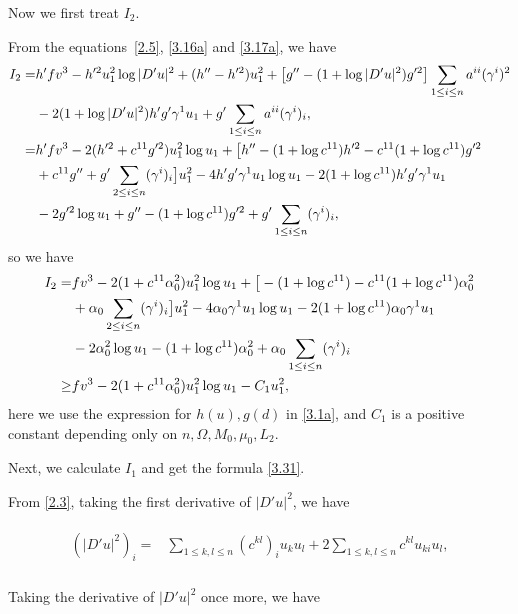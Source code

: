 \documentclass[11pt]{amsart}
\numberwithin{equation}{section}
\begin{document}
Now we first treat $I_2$.

From the equations~\eqref{2.5}, \eqref{3.16a}  and \eqref{3.17a}, we have
\begin{align}
I_2
=&h'f v^3-h'^2u_1^2\log|D'u|^2+(h''-h'^2)u_1^2+\big[g''-(1+\log|D'u|^2)g'^2\big]\sum_{1\leq i\leq n}a^{ii}(\gamma^i)^2\notag\\
&-2(1+\log|D'u|^2)h'g'\gamma^1u_1+g'\sum_{1\leq i\leq n}a^{ii}(\gamma^i)_i,\notag\\
=&h'f v^3-2(h'^2+c^{11}g'^2) u_1^2\log u_1+\big[h''-(1+\log c^{11})h'^2-c^{11}(1+\log c^{11})g'^2\notag\\
&+c^{11}g''+g'\sum_{2\leq i\leq n}(\gamma^i)_i\big] u_1^2-4h'g'\gamma^1 u_1\log u_1-2(1+\log c^{11})h'g'\gamma^1 u_1\notag\\
&-2g'^2 \log u_1+g''-(1+\log c^{11})g'^2
+g'\sum_{1\leq i\leq n}(\gamma^i)_i,\label{3.17b}
\end{align}
so we have
\begin{align}
I_2
=&f v^3-2(1+c^{11}\alpha_0^2) u_1^2\log u_1+\big[-(1+\log c^{11})-c^{11}(1+\log c^{11})\alpha_0^2\notag\\
&+\alpha_0\sum_{2\leq i\leq n}(\gamma^i)_i\big] u_1^2-4\alpha_0\gamma^1 u_1\log u_1-2(1+\log c^{11})\alpha_0\gamma^1 u_1\notag\\
&-2\alpha_0^2 \log u_1-(1+\log c^{11})\alpha_0^2
+\alpha_0\sum_{1\leq i\leq n}(\gamma^i)_i\notag\\
\geq&f v^3-2(1+c^{11}\alpha_0^2) u_1^2\log u_1-C_1u_1^2,\label{3.18}
\end{align}
here we use the expression for $h(u), g(d)$ in \eqref{3.1a}, and $C_1$  is a positive constant  depending  only on $n, \Omega, M_0, \mu_0, L_2$.\par

Next, we calculate $I_1$ and get the formula \eqref{3.31}. \par

From \eqref{2.3}, taking the first  derivative of $|D'u|^2$, we have

\begin{align}\label{3.19}
\begin{split}
(|D'u|^2)_i=&\sum_{1\leq k, l\leq n}(c^{kl})_iu_ku_l+2\sum_{1\leq k, l\leq n}c^{kl}u_{ki}u_l,\\
\end{split}
\end{align}

Taking the derivative of $|D'u|^2$ once more, we have
\end{document}
